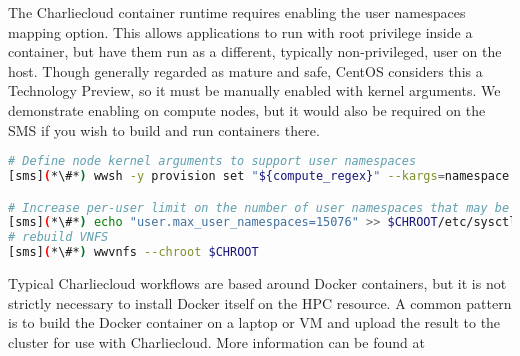 The Charliecloud container runtime requires enabling the user namespaces mapping
option. This allows applications to run with root privilege inside a container, 
but have them run as a different, typically non-privileged, user on the host.
Though generally regarded as mature and safe, CentOS considers this a Technology
Preview, so it must be manually enabled with kernel arguments. We demonstrate
enabling on compute nodes, but it would also be required on the SMS if you wish
to build and run containers there.

\begin{lstlisting}[language=bash,keywords={},upquote=true]
# Define node kernel arguments to support user namespaces
[sms](*\#*) wwsh -y provision set "${compute_regex}" --kargs=namespace.unpriv_enable=1

# Increase per-user limit on the number of user namespaces that may be created
[sms](*\#*) echo "user.max_user_namespaces=15076" >> $CHROOT/etc/sysctl.conf
# rebuild VNFS
[sms](*\#*) wwvnfs --chroot $CHROOT
\end{lstlisting}

\begin{center}
\begin{tcolorbox}[]
\small
Typical Charliecloud workflows are based around Docker containers, but it is not
strictly necessary to install Docker itself on the HPC resource. A common
pattern is to build the Docker container on a laptop or VM and upload the result
to the cluster for use with Charliecloud. More information can be found at
\href{https://hpc.github.io/charliecloud/}
    {\color{blue}{https://hpc.github.io/charliecloud/}}
\end{tcolorbox}
\end{center}
